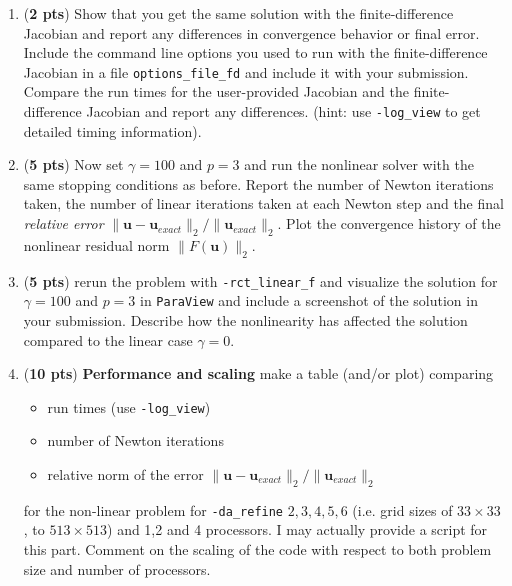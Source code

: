 \documentclass[11pt]{article}
\begin{document}
\begin{enumerate}
    \item (\textbf{2 pts}) Show that you get the same solution with the finite-difference Jacobian and report any differences in convergence behavior or final error. Include the command line options you used to run with the finite-difference Jacobian in a file \texttt{options\_file\_fd} and include it with your submission. Compare the run times for the user-provided Jacobian and the finite-difference Jacobian and report any differences. (hint: use \texttt{-log\_view} to get detailed timing information).
    \item (\textbf{5 pts}) Now set $\gamma=100$ and $p=3$ and run the nonlinear solver with the same stopping conditions as before. Report the number of Newton iterations taken, the number of linear iterations taken at each Newton step and the final \emph{relative error} $\|\mathbf{u}-\mathbf{u}_{exact}\|_2/\|\mathbf{u}_{exact}\|_2$. Plot the convergence history of the nonlinear residual norm $\|F(\mathbf{u})\|_2$.
    \item (\textbf{5 pts}) rerun the problem with \texttt{-rct\_linear\_f} and visualize the solution for $\gamma=100$ and $p=3$ in \texttt{ParaView} and include a screenshot of the solution in your submission. Describe how the nonlinearity has affected the solution compared to the linear case $\gamma=0$.
    \item (\textbf{10 pts}) \textbf{Performance and scaling} make a table (and/or plot) comparing
      \begin{itemize}
        \item run times (use \texttt{-log\_view})
        \item  number of Newton iterations
        \item relative norm of the error $\|\mathbf{u}-\mathbf{u}_{exact}\|_2/\|\mathbf{u}_{exact}\|_2$
      \end{itemize}
      for the non-linear problem for \texttt{-da\_refine} $2,3,4,5,6$ (i.e. grid sizes of $33\times 33$, to $513\times 513$) and 1,2 and 4 processors. I may actually provide a script for this part. Comment on the scaling of the code with respect to both problem size and number of processors.
  \end{enumerate}

  
\end{document}
